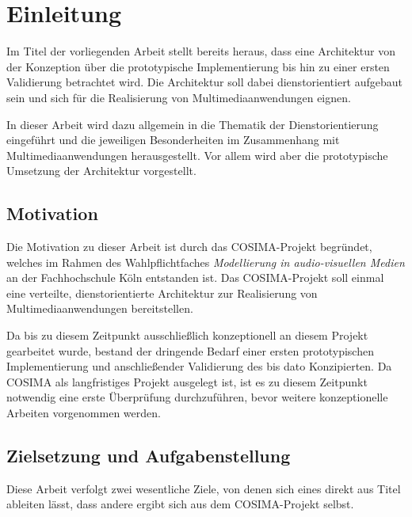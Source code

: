 
\chapter{Einleitung} %
\label{cha:einleitung}

  Im Titel der vorliegenden Arbeit stellt bereits heraus, dass eine Architektur von der Konzeption über die prototypische Implementierung bis hin zu einer ersten Validierung betrachtet wird. Die Architektur soll dabei dienstorientiert aufgebaut sein und sich für die Realisierung von Multimediaanwendungen eignen.
  
  In dieser Arbeit wird dazu allgemein in die Thematik der Dienstorientierung eingeführt und die jeweiligen Besonderheiten im Zusammenhang mit Multimediaanwendungen herausgestellt. Vor allem wird aber die prototypische Umsetzung der Architektur vorgestellt.

\section{Motivation} %
\label{sec:motivation}

  Die Motivation zu dieser Arbeit ist durch das COSIMA-Projekt begründet, welches im Rahmen des Wahlpflichtfaches \emph{Modellierung in audio-visuellen Medien} an der Fachhochschule Köln entstanden ist. Das COSIMA-Projekt soll einmal eine verteilte, dienstorientierte Architektur zur Realisierung von Multimediaanwendungen bereitstellen.
  
  Da bis zu diesem Zeitpunkt ausschließlich konzeptionell an diesem Projekt gearbeitet wurde, bestand der dringende Bedarf einer ersten prototypischen Implementierung und anschließender Validierung des bis dato Konzipierten. Da COSIMA als langfristiges Projekt ausgelegt ist, ist es zu diesem Zeitpunkt notwendig eine erste Überprüfung durchzuführen, bevor weitere konzeptionelle Arbeiten vorgenommen werden.


\section{Zielsetzung und Aufgabenstellung} %
\label{sec:zielsetzung_und_aufgabenstellung}

  Diese Arbeit verfolgt zwei wesentliche Ziele, von denen sich eines direkt aus Titel ableiten lässt, dass andere ergibt sich aus dem COSIMA-Projekt selbst.

